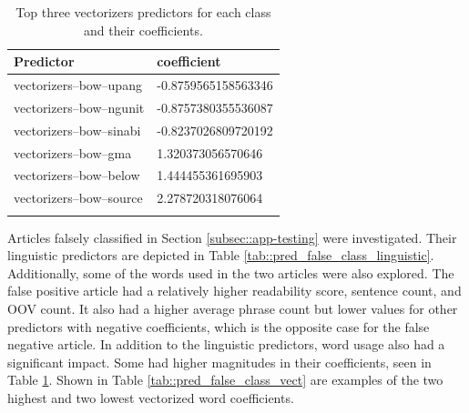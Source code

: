 \begin{table}
    \begin{tabularx}{\textwidth}{|l|l|}
        \hline
        Predictor & coefficient \\ 
        \hline
        \rowcolor{LightRed}
        vectorizers--bow--upang & -0.8759565158563346\\
        \hline
        \rowcolor{LightRed}
        vectorizers--bow--ngunit & -0.8757380355536087\\
        \hline
        \rowcolor{LightRed}
        vectorizers--bow--sinabi & -0.8237026809720192\\
        \hline
        \rowcolor{LightGreen}
        vectorizers--bow--gma & 1.320373056570646\\
        \hline
        \rowcolor{LightGreen}
        vectorizers--bow--below & 1.444455361695903\\
        \hline
        \rowcolor{LightGreen}
        vectorizers--bow--source & 2.278720318076064\\
        \hline
    \caption{Top three vectorizers predictors for each class and their coefficients.}
    \label{tab::vec_coef}
    \end{tabularx}
\end{table}

Articles falsely classified in Section \ref{subsec::app-testing} were investigated. Their linguistic predictors are depicted in Table \ref{tab::pred_false_class_linguistic}. Additionally, some of the words used in the two articles were also explored. The false positive article had a relatively higher readability score, sentence count, and OOV count. It also had a higher average phrase count but lower values for other predictors with negative coefficients, which is the opposite case for the false negative article. In addition to the linguistic predictors, word usage also had a significant impact. Some had higher magnitudes in their coefficients, seen in Table \ref{tab::vec_coef}. Shown in Table \ref{tab::pred_false_class_vect} are examples of the two highest and two lowest vectorized word coefficients.

